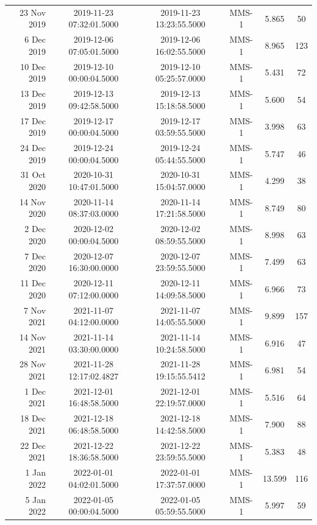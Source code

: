 \begin{longtable}{r|ccccc}
23 Nov 2019    &  2019-11-23 07:32:01.5000 &  2019-11-23 13:23:55.5000 &  MMS-1 &    5.865 &     50 \\
6 Dec 2019     &  2019-12-06 07:05:01.5000 &  2019-12-06 16:02:55.5000 &  MMS-1 &    8.965 &    123 \\
10 Dec 2019    &  2019-12-10 00:00:04.5000 &  2019-12-10 05:25:57.0000 &  MMS-1 &    5.431 &     72 \\
13 Dec 2019    &  2019-12-13 09:42:58.5000 &  2019-12-13 15:18:58.5000 &  MMS-1 &    5.600 &     54 \\
17 Dec 2019    &  2019-12-17 00:00:04.5000 &  2019-12-17 03:59:55.5000 &  MMS-1 &    3.998 &     63 \\
24 Dec 2019    &  2019-12-24 00:00:04.5000 &  2019-12-24 05:44:55.5000 &  MMS-1 &    5.747 &     46 \\
31 Oct 2020    &  2020-10-31 10:47:01.5000 &  2020-10-31 15:04:57.0000 &  MMS-1 &    4.299 &     38 \\
14 Nov 2020    &  2020-11-14 08:37:03.0000 &  2020-11-14 17:21:58.5000 &  MMS-1 &    8.749 &     80 \\
2 Dec 2020     &  2020-12-02 00:00:04.5000 &  2020-12-02 08:59:55.5000 &  MMS-1 &    8.998 &     63 \\
7 Dec 2020     &  2020-12-07 16:30:00.0000 &  2020-12-07 23:59:55.5000 &  MMS-1 &    7.499 &     63 \\
11 Dec 2020    &  2020-12-11 07:12:00.0000 &  2020-12-11 14:09:58.5000 &  MMS-1 &    6.966 &     73 \\
7 Nov 2021     &  2021-11-07 04:12:00.0000 &  2021-11-07 14:05:55.5000 &  MMS-1 &    9.899 &    157 \\
14 Nov 2021    &  2021-11-14 03:30:00.0000 &  2021-11-14 10:24:58.5000 &  MMS-1 &    6.916 &     47 \\
28 Nov 2021    &  2021-11-28 12:17:02.4827 &  2021-11-28 19:15:55.5412 &  MMS-1 &    6.981 &     54 \\
1 Dec 2021     &  2021-12-01 16:48:58.5000 &  2021-12-01 22:19:57.0000 &  MMS-1 &    5.516 &     64 \\
18 Dec 2021    &  2021-12-18 06:48:58.5000 &  2021-12-18 14:42:58.5000 &  MMS-1 &    7.900 &     88 \\
22 Dec 2021    &  2021-12-22 18:36:58.5000 &  2021-12-22 23:59:55.5000 &  MMS-1 &    5.383 &     48 \\
1 Jan 2022     &  2022-01-01 04:02:01.5000 &  2022-01-01 17:37:57.0000 &  MMS-1 &   13.599 &    116 \\
5 Jan 2022     &  2022-01-05 00:00:04.5000 &  2022-01-05 05:59:55.5000 &  MMS-1 &    5.997 &     59 \\

\end{longtable}
